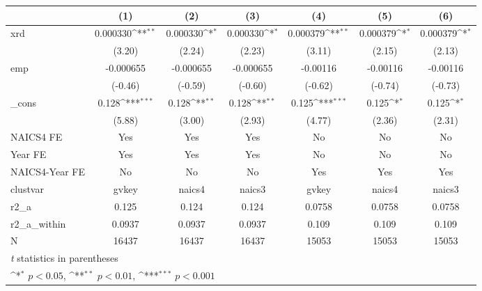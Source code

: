 {
\def\sym#1{\ifmmode^{#1}\else\(^{#1}\)\fi}
\begin{tabular}{l*{6}{c}}
\hline\hline
            &\multicolumn{1}{c}{(1)}         &\multicolumn{1}{c}{(2)}         &\multicolumn{1}{c}{(3)}         &\multicolumn{1}{c}{(4)}         &\multicolumn{1}{c}{(5)}         &\multicolumn{1}{c}{(6)}         \\
\hline
xrd         &    0.000330\sym{**} &    0.000330\sym{*}  &    0.000330\sym{*}  &    0.000379\sym{**} &    0.000379\sym{*}  &    0.000379\sym{*}  \\
            &      (3.20)         &      (2.24)         &      (2.23)         &      (3.11)         &      (2.15)         &      (2.13)         \\
[1em]
emp         &   -0.000655         &   -0.000655         &   -0.000655         &    -0.00116         &    -0.00116         &    -0.00116         \\
            &     (-0.46)         &     (-0.59)         &     (-0.60)         &     (-0.62)         &     (-0.74)         &     (-0.73)         \\
[1em]
\_cons      &       0.128\sym{***}&       0.128\sym{**} &       0.128\sym{**} &       0.125\sym{***}&       0.125\sym{*}  &       0.125\sym{*}  \\
            &      (5.88)         &      (3.00)         &      (2.93)         &      (4.77)         &      (2.36)         &      (2.31)         \\
[1em]
NAICS4 FE   &         Yes         &         Yes         &         Yes         &          No         &          No         &          No         \\
[1em]
Year FE     &         Yes         &         Yes         &         Yes         &          No         &          No         &          No         \\
[1em]
NAICS4-Year FE&          No         &          No         &          No         &         Yes         &         Yes         &         Yes         \\
\hline
clustvar    &       gvkey         &      naics4         &      naics3         &       gvkey         &      naics4         &      naics3         \\
r2\_a        &       0.125         &       0.124         &       0.124         &      0.0758         &      0.0758         &      0.0758         \\
r2\_a\_within &      0.0937         &      0.0937         &      0.0937         &       0.109         &       0.109         &       0.109         \\
N           &       16437         &       16437         &       16437         &       15053         &       15053         &       15053         \\
\hline\hline
\multicolumn{7}{l}{\footnotesize \textit{t} statistics in parentheses}\\
\multicolumn{7}{l}{\footnotesize \sym{*} \(p<0.05\), \sym{**} \(p<0.01\), \sym{***} \(p<0.001\)}\\
\end{tabular}
}
